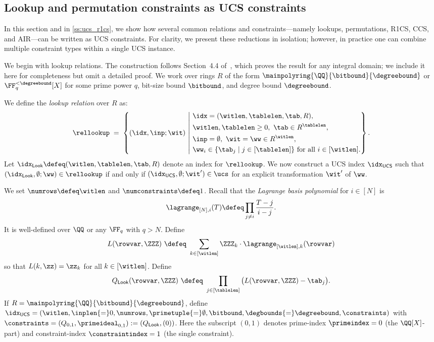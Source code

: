 \subsection{Lookup and permutation constraints as UCS constraints}\label{ss:ucs_lookup}

In this section and in \cref{ss:ucs_r1cs}, we show how several common relations and constraints---namely lookups, permutations, R1CS, CCS, and AIR---can be written as UCS constraints. For clarity, we present these reductions in isolation; however, in practice one can combine multiple constraint types within a single UCS instance.


We begin with lookup relations.
The construction follows Section~4.4 of~\cite{Zinc}, which proves the result for any integral domain; we include it here for completeness but omit a detailed proof.
We work over rings $R$ of the form $\mainpolyring{\QQ}{\bitbound}{\degreebound}$ or
$\FF_q^{< \degreebound}[X]$ for some prime power $q$, bit-size bound $\bitbound$, and degree bound
$\degreebound$.

We define the \emph{lookup relation} over $R$ as:
\[
\rellookup \;=\;
\left\{(\idx,\inp;\wit)\ \middle|\ 
\begin{aligned}
&\idx=(\witlen,\tablelen,\tab,R),\\
&\witlen, \tablelen\ge 0,\ \tab \in R^{\tablelen},\\
&\inp=\emptyset,\ \wit=\ww \in R^{\witlen},\\
& \ww_i\in\{\tab_{j}\mid j\in [\tablelen]\} \text{ for all }  i\in [\witlen].
\end{aligned}
\right\}.
\]
Let $\idx_{\mathsf{Look}}\defeq(\witlen,\tablelen,\tab,R)$ denote an index for $\rellookup$.
We now construct a UCS index $\idx_{\mathsf{UCS}}$ such that
$(\idx_{\mathsf{Look}},\emptyset;\ww)\in \rellookup$ if and only if
$(\idx_{\mathsf{UCS}},\emptyset;\wit')\in \ucs$ for an explicit transformation $\wit'$ of $\ww$.

We set $\numrows\defeq \witlen$ and $\numconstraints\defeq 1$.
Recall that the \emph{Lagrange basis polynomial} for $i\in[N]$ is
\begin{equation}\label{e: lagrange_basis}
\lagrange_{[N],i}(T) \defeq \prod_{j\neq i}\frac{T-j}{i-j}.
\end{equation}
It is well-defined over $\QQ$ or any $\FF_q$ with $q>N$.
Define
\begin{equation}\label{eq:L_lookup}
L(\rowvar,\ZZZ)\ \defeq\  
\sum_{k\in [\witlen]}\ZZZ_{k}\cdot \lagrange_{[\witlen],k}(\rowvar)
\end{equation}
so that $L(k,\zz)=\zz_{k}$ for all $k\in [\witlen]$.
Define
\begin{equation}
\label{eq:Q_lookup}
Q_{\mathsf{Look}}(\rowvar,\ZZZ)
\ \defeq\
\prod_{j\in[\tablelen]}\big(L(\rowvar,\ZZZ)-\tab_{j}\big).
\end{equation}
%
If $R=\mainpolyring{\QQ}{\bitbound}{\degreebound}$, define
$\idx_{\mathsf{UCS}}=(\witlen,\inplen{=}0,\numrows,\primetuple{=}\emptyset,\bitbound,\degbounds{=}\degreebound,\constraints)$ with
$\constraints=(Q_{0,1},\primeideal_{0,1}):=(Q_{\mathsf{Look}},(0))$.
Here the subscript $(0,1)$ denotes prime-index $\primeindex=0$ (the $\QQ[X]$-part) and constraint-index $\constraintindex=1$ (the single constraint).

